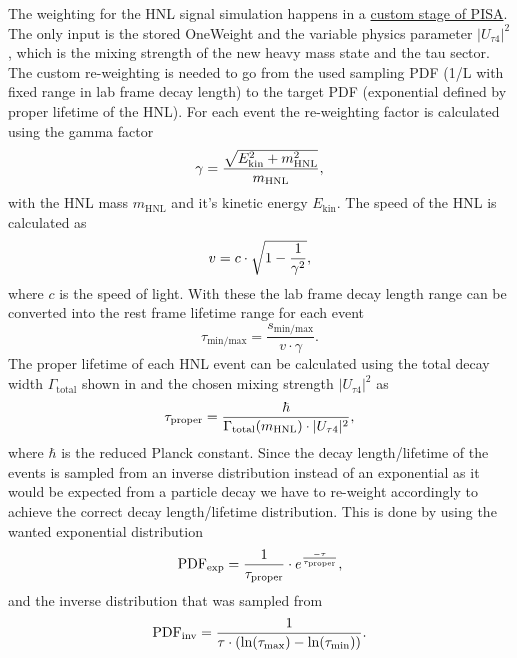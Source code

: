The weighting for the HNL signal simulation happens in a \href{https://github.com/icecube/pisa/blob/master/pisa/stages/aeff/weight_hnl.py}{custom stage of PISA}. The only input is the stored OneWeight and the variable physics parameter $|U_{\tau4}|^2$, which is the mixing strength of the new heavy mass state and the tau sector. The custom re-weighting is needed to go from the used sampling PDF (1/L with fixed range in lab frame decay length) to the target PDF (exponential defined by proper lifetime of the HNL). For each event the re-weighting factor is calculated using the gamma factor
\begin{equation}
    \gamma = \frac{\sqrt{E_\mathrm{kin}^2+m_\mathrm{HNL}^2}}{m_\mathrm{HNL}},
    \labeq{gamma_factor}
\end{equation}
with the HNL mass $m_\mathrm{HNL}$ and it's kinetic energy $E_\mathrm{kin}$. The speed of the HNL is calculated as
\begin{equation}
    v = c \cdot \sqrt{1 - \frac{1}{\gamma^2}},
    \labeq{lorentz_speed}
\end{equation}
where $c$ is the speed of light. With these the lab frame decay length range can be converted into the rest frame lifetime range for each event
\begin{equation}
    \tau_\mathrm{min/max} = \frac{s_\mathrm{min/max}}{v\cdot\gamma}.
\end{equation}
The proper lifetime of each HNL event can be calculated using the total decay width $\Gamma_\mathrm{total}$ shown in  and the chosen mixing strength $|U_{\tau4}|^2$ as
\begin{equation}
    \tau_\mathrm{proper} = \frac{\hbar}{\Gamma_\mathrm{total}(m_\mathrm{HNL}) \cdot |U_{\tau4}|^2},
    \labeq{proper_lifetime}
\end{equation}
where $\hbar$ is the reduced Planck constant. Since the decay length/lifetime of the events is sampled from an inverse distribution instead of an exponential as it would be expected from a particle decay we have to re-weight accordingly to achieve the correct decay length/lifetime distribution. This is done by using the wanted exponential distribution
\begin{equation}
    \mathrm{PDF}_\mathrm{exp} = \frac{1}{\tau_\mathrm{proper}} \cdot e^{\frac{-\tau}{\tau_\mathrm{proper}}},
    \labeq{pdf_exponential}
\end{equation}
and the inverse distribution that was sampled from
\begin{equation}
    \mathrm{PDF}_\mathrm{inv} = \frac{1}{\tau \cdot (\ln(\tau_\mathrm{max}) - \ln(\tau_\mathrm{min}))}.
    \labeq{pdf_inverse}
\end{equation}
